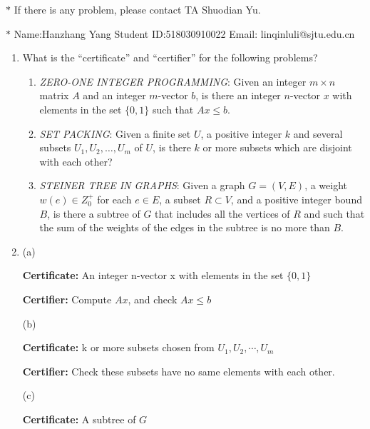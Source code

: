 \documentclass[12pt,a4paper]{article}
\makeatletter
\newtheorem*{solution}{Solution}
\theoremstyle{definition}
\renewenvironment{solution}[1][Solution] {\par\pushQED{\qed}\normalfont\topsep6\p@\@plus6\p@\relax\trivlist\item[\hskip\labelsep\bfseries#1\@addpunct{.}]\ignorespaces}{\popQED\endtrivlist\@endpefalse} \makeatother
\makeatother
\begin{document}
\noindent

\noindent{}
\begin{center}
\footnotesize{\color{red}$*$ If there is any problem, please contact TA Shuodian Yu. }

\footnotesize{\color{blue}$*$ Name:Hanzhang Yang  \quad Student ID:518030910022 \quad Email: linqinluli@sjtu.edu.cn}
\end{center}
\begin{enumerate}
	\item What is the ``certificate'' and ``certifier'' for the following problems?
	\begin{enumerate}
		\item \emph{ZERO-ONE INTEGER PROGRAMMING}: Given an integer $m \times n$ matrix $A$ and an integer $m$-vector $b$, is there an integer $n$-vector $x$ with elements in the set $\{0, 1\}$ such that $Ax \leq b$.
		\item \emph{SET PACKING}: Given a finite set $U$, a positive integer $k$ and several subsets $U_1, U_2, \ldots, U_m$ of $U$, is there $k$ or more subsets which are disjoint with each other?
		\item \emph{STEINER TREE IN GRAPHS}: Given a graph $G=(V,E)$, a weight $w(e)\in Z_0^{+}$ for each $e\in E$, a subset $R \subset V$, and a positive integer bound $B$, is there a subtree of $G$ that includes all the vertices of $R$ and such that the sum of the weights of the edges in the subtree is no more than $B$.
	\end{enumerate}
	    \begin{solution}
			(a)
		
			\textbf{Certificate:} An integer n-vector x with elements in the set $\{0,1\}$
			
			\textbf{Certifier:} Compute $Ax$, and check $Ax\le b$
	
			(b)
	
			\textbf{Certificate:} k or more subsets chosen from $U_1,U_2,\cdots,U_m$
			
			\textbf{Certifier:} Check these subsets have no same elements with each other.
	
			(c)
	
			\textbf{Certificate:} A subtree of $G$
			

\end{solution}
\end{enumerate}
\end{document}
